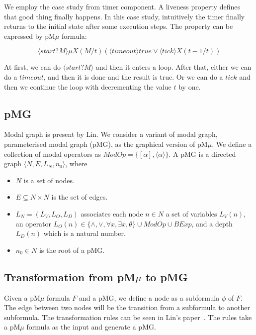 \documentclass[runningheads,a4paper]{llncs}
\begin{document}
 
 
We employ the case study from timer component\cite{mavridou2016architectrue}. A liveness property defines that good thing finally happens. In this case study, intuitively the timer finally returns to the initial state after some execution steps. The property can be expressed by pM$\mu$ formula:

\begin{equation}\label{formula1}
	\langle start?M\rangle\mu X(M/t)(\langle timeout\rangle true \vee \langle tick\rangle X(t-1/t))
\end{equation}

At first, we can do $\langle start?M\rangle$ and then it enters a loop. After that, either we can do a $timeout$, and then it is done and the result is true. Or we can do a $tick$ and then we continue the loop with decrementing the value $t$ by one. 


\subsection{pMG}

Modal graph is present by Lin\cite{lin2001modal}. We consider a variant of modal graph, parameterised modal graph (pMG), as the graphical version of pM$\mu$. We define a collection of modal operators as $ModOp = \{[\alpha], \langle\alpha\rangle\}$. A pMG is a directed graph $\langle N, E, L_{N}, n_{0}\rangle$, where
\begin{itemize}
	\item $N$ is a set of nodes.
	\item $E \subseteq N\times N$ is the set of edges.
	\item $L_{N} = (L_{V}, L_{O}, L_{D})$ associates each node $n\in N$ a set of variables $L_{V}(n)$, an operator $L_{O}(n)\in\{\wedge, \vee, \forall x, \exists x, \theta\}\cup ModOp \cup BExp$, and a depth $L_{D}(n)$ which is a natural number.
	\item $n_{0} \in N$ is the root of a pMG.
\end{itemize}



\subsection{Transformation from pM$\mu$ to pMG}

 Given a pM$\mu$ formula $F$ and a pMG, we define a node as a subformula $\phi$ of $F$. The edge between two nodes will be the transition from a subformula to another subformula. The transformation rules can be seen in Lin's paper~\cite{lin2001modal}. The rules take a pM$\mu$ formula as the input and generate a pMG. 
\end{document}
